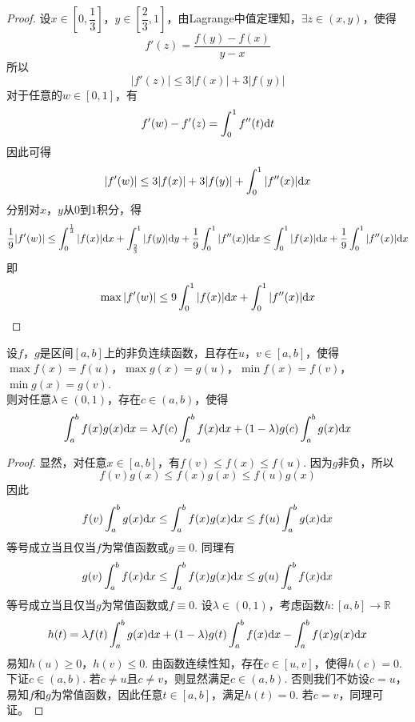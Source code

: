 \begin{proof}

    设$x \in \left[0, \dfrac{1}{3}\right]$，$y \in \left[\dfrac{2}{3}, 1\right]$，由\textup{Lagrange}中值定理知，$\exists z \in (x,y)$，使得
    $$f'(z) = \dfrac{f(y) - f(x)}{y - x}$$
    所以
    $$|f'(z)| \leq 3|f(x)| + 3|f(y)|$$
    对于任意的$w \in [0,1]$，有
    $$f'(w) - f'(z) = \int_{0}^{1}{f''(t)}\mathrm{d} t$$
    因此可得
    $$|f'(w)| \leq 3|f(x)| + 3|f(y)| + \int_{0}^{1}{|f''(x)|}\mathrm{d} x$$
    分别对$x$，$y$从$0$到$1$积分，得
    $$\dfrac{1}{9} |f'(w)| \leq \int_{0}^{\frac{1}{3}}{|f(x)|}\mathrm{d} x + \int_{\frac{2}{3}}^{1}{|f(y)|}\mathrm{d} y + \dfrac{1}{9} \int_{0}^{1}{|f''(x)|}\mathrm{d} x \leq \int_{0}^{1}{|f(x)|}\mathrm{d} x + \dfrac{1}{9}\int_{0}^{1}{|f''(x)|}\mathrm{d} x$$
    即
    $$\max{|f'(w)|} \leq 9\int_{0}^{1}{|f(x)|}\mathrm{d} x + \int_{0}^{1}{|f''(x)|}\mathrm{d} x$$
    
\end{proof}

\begin{theorem}
    
    设$f$，$g$是区间$[a,b]$上的非负连续函数，且存在$u$，$v \in [a,b]$，使得$\max{f(x)} = f(u)$，$\max{g(x)} = g(u)$，$\min{f(x)} = f(v)$，$\min{g(x)} = g(v)$. \\
    则对任意$\lambda \in (0,1)$，存在$c \in (a,b)$，使得
    $$\int_{a}^{b}{f(x)g(x)}\mathrm{d} x = \lambda f(c) \int_{a}^{b}{f(x)}\mathrm{d} x + (1 - \lambda)g(c)\int_{a}^{b}{g(x)}\mathrm{d} x$$

\end{theorem}

\begin{proof}

    显然，对任意$x \in [a,b]$，有$f(v) \leq f(x) \leq f(u)$. 因为$g$非负，所以
    $$f(v)g(x) \leq f(x)g(x) \leq f(u)g(x)$$
    因此
    $$f(v) \int_{a}^{b}{g(x)}\mathrm{d} x \leq \int_{a}^{b}{f(x)g(x)}\mathrm{d} x \leq f(u) \int_{a}^{b}{g(x)}\mathrm{d} x$$
    等号成立当且仅当$f$为常值函数或$g \equiv 0$. 同理有
    $$g(v) \int_{a}^{b}{f(x)}\mathrm{d} x \leq \int_{a}^{b}{f(x)g(x)}\mathrm{d} x \leq g(u) \int_{a}^{b}{f(x)}\mathrm{d} x$$
    等号成立当且仅当$g$为常值函数或$f \equiv 0$. 设$\lambda \in (0,1)$，考虑函数$h : [a,b] \to \mathbb{R}$
    $$h(t) = \lambda f(t) \int_{a}^{b}{g(x)}\mathrm{d} x + (1 - \lambda)g(t)\int_{a}^{b}{f(x)}\mathrm{d} x - \int_{a}^{b}{f(x)g(x)}\mathrm{d} x$$
    易知$h(u) \geq 0$，$h(v) \leq 0$. 由函数连续性知，存在$c \in [u,v]$，使得$h(c) = 0$. \\
    下证$c \in (a,b)$. 若$c \neq u$且$c \neq v$，则显然满足$c \in (a,b)$. 
    否则我们不妨设$c = u$，易知$f$和$g$为常值函数，因此任意$t \in [a,b]$，满足$h(t) = 0$. 若$c = v$，同理可证。

\end{proof} 
